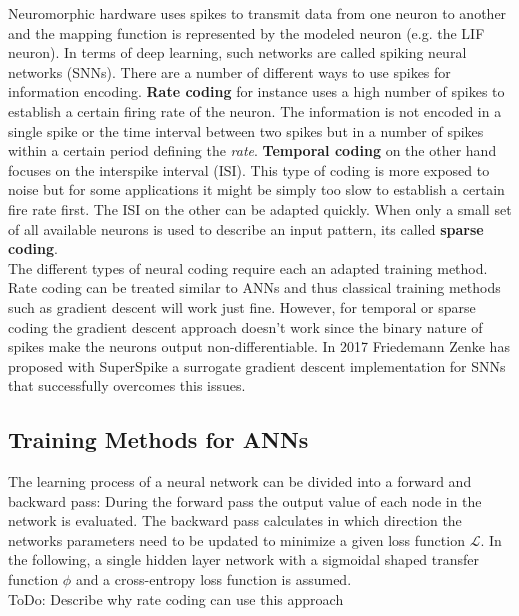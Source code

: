 Neuromorphic hardware uses spikes to transmit data from one neuron to another and the mapping function is represented by the modeled neuron (e.g. the LIF neuron). In terms of deep learning, such networks are called spiking neural networks (SNNs). There are a number of different ways to use spikes for information encoding. \textbf{Rate coding} for instance uses a high number of spikes to establish a certain firing rate of the neuron. The information is not encoded in a single spike or the time interval between two spikes but in a number of spikes within a certain period defining the \textit{rate}. \textbf{Temporal coding} on the other hand focuses on the interspike interval (ISI). This type of coding is more exposed to noise but for some applications it might be simply too slow to establish a certain fire rate first. The ISI on the other can be adapted quickly. When only a small set of all available neurons is used to describe an input pattern, its called \textbf{sparse coding}.\\

The different types of neural coding require each an adapted training method. Rate coding can be treated similar to ANNs and thus classical training methods such as gradient descent will work just fine. However, for temporal or sparse coding the gradient descent approach doesn't work since the binary nature of spikes make the neurons output non-differentiable. In 2017 Friedemann Zenke has proposed with SuperSpike a surrogate gradient descent implementation for SNNs that successfully overcomes this issues. 

\subsection{Training Methods for ANNs}
\label{trainingANN}

The learning process of a neural network can be divided into a forward and backward pass: During the forward pass the output value of each node in the network is evaluated. The backward pass calculates in which direction the networks parameters need to be updated to minimize a given loss function $\mathcal{L}$. In the following, a single hidden layer network with a sigmoidal shaped transfer function $\phi$ and a cross-entropy loss function is assumed.\\

ToDo: Describe why rate coding can use this approach

